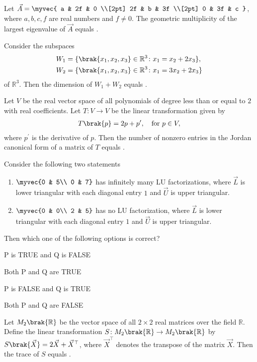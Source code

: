 \item Let $\vec{A} =
\myvec{ a & 2f & 0 \\[2pt] 2f & b & 3f \\[2pt] 0 & 3f & c }$, where $a, b, c, f$ are real numbers and $f \ne 0$. The geometric multiplicity of the largest eigenvalue of $\vec{A}$ equals \underline{\hspace{2cm}}.
\hfill{}
\item Consider the subspaces
\begin{align*}
W_1 &= \{\brak{x_1, x_2, x_3} \in \mathbb{R}^3 \colon x_1 = x_2 + 2x_3\},\\
W_2 &= \{\brak{x_1, x_2, x_3} \in \mathbb{R}^3 \colon x_1 = 3x_2 + 2x_3\}
\end{align*}
of $\mathbb{R}^3$. Then the dimension of $W_1 + W_2$ equals \underline{\hspace{2cm}}. 
\hfill{}
\item Let $V$ be the real vector space of all polynomials of degree less than or equal to $2$ with real
coefficients. Let $T \colon V \to V$ be the linear transformation given by
\begin{align*}
T\brak{p} = 2p+ p^{\prime},\quad \text{for } p \in V,
\end{align*}
where $p^{\prime}$ is the derivative of $p$. Then the number of nonzero entries in the Jordan canonical
form of a matrix of $T$ equals \underline{\hspace{2cm}}. 
\hfill{}
\item Consider the following two statements
		\begin{enumerate}[label=\Alph*:, start=16]
			\item $\myvec{0 & 5\\ 0 & 7}$ has infinitely many LU factorizations, where $\vec{L}$ is lower triangular
with each diagonal entry $1$ and $\vec{U}$ is upper triangular.
\item $ \myvec{0 & 0\\ 2 & 5}$ has no LU factorization, where $\vec{L}$ is lower triangular with each diagonal entry $1$ and $\vec{U}$ is upper triangular.
\end{enumerate}
Then which one of the following options is correct?
\hfill{}
\begin{enumerate}
\begin{multicols}{2}
\item P is TRUE and Q is FALSE
\item Both P and Q are TRUE
\item P is FALSE and Q is TRUE
\item Both P and Q are FALSE
\end{multicols}
\end{enumerate}
\item Let $M_2\brak{\mathbb{R}}$ be the vector space of all $2 \times 2$ real matrices over the field $\mathbb{R}$. Define the linear
transformation $S \colon M_2\brak{\mathbb{R}} \to M_2\brak{\mathbb{R}}$ by $S\brak{\vec{X}} = 2\vec{X} + \vec{X}^{\top}$, where $\vec{X}^{\top}$ denotes the transpose
of the matrix $\vec{X}$. Then the trace of $S$ equals \underline{\hspace{2cm}}. 

